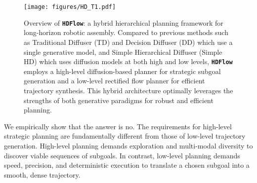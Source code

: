 \documentclass{article} %
\begin{document}
\begin{figure}[t]
    \centering
    \texttt{[image: figures/HD\_T1.pdf]}
    \caption{Overview of \texttt{\textbf{HDFlow}}: a hybrid hierarchical planning framework for long-horizon robotic assembly. Compared to previous methods such as Traditional Diffuser (TD) and Decision Diffuser (DD) which use a single generative model, and Simple Hierarchical Diffuser (Simple HD) which uses diffusion models at both high and low levels, \texttt{\textbf{HDFlow}} employs a high-level diffusion-based planner for strategic subgoal generation and a low-level rectified flow planner for efficient trajectory synthesis. This hybrid architecture optimally leverages the strengths of both generative paradigms for robust and efficient planning. 
    \vspace{-2em}}
    \label{fig:teaser}
\end{figure}

We empirically show that the answer is no. The requirements for high-level strategic planning are fundamentally different from those of low-level trajectory generation. High-level planning demands exploration and multi-modal diversity to discover viable sequences of subgoals. In contrast, low-level planning demands speed, precision, and deterministic execution to translate a chosen subgoal into a smooth, dense trajectory.
\end{document}
